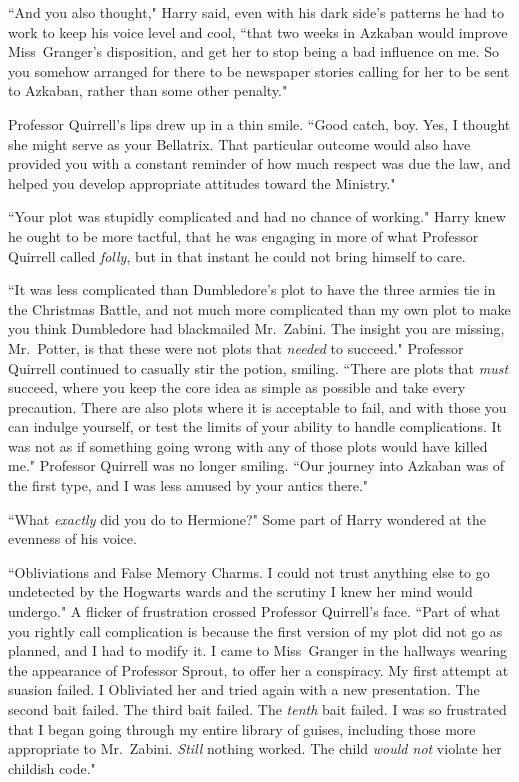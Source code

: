 ``And you also thought," Harry said, even with his dark side's patterns he had to work to keep his voice level and cool, ``that two weeks in Azkaban would improve Miss~Granger's disposition, and get her to stop being a bad influence on me. So you somehow arranged for there to be newspaper stories calling for her to be sent to Azkaban, rather than some other penalty."

Professor Quirrell's lips drew up in a thin smile. ``Good catch, boy. Yes, I thought she might serve as your Bellatrix. That particular outcome would also have provided you with a constant reminder of how much respect was due the law, and helped you develop appropriate attitudes toward the Ministry."

``Your plot was stupidly complicated and had no chance of working." Harry knew he ought to be more tactful, that he was engaging in more of what Professor Quirrell called \emph{folly}, but in that instant he could not bring himself to care.

``It was less complicated than Dumbledore's plot to have the three armies tie in the Christmas Battle, and not much more complicated than my own plot to make you think Dumbledore had blackmailed Mr.~Zabini. The insight you are missing, Mr.~Potter, is that these were not plots that \emph{needed} to succeed." Professor Quirrell continued to casually stir the potion, smiling. ``There are plots that \emph{must} succeed, where you keep the core idea as simple as possible and take every precaution. There are also plots where it is acceptable to fail, and with those you can indulge yourself, or test the limits of your ability to handle complications. It was not as if something going wrong with any of those plots would have killed me." Professor Quirrell was no longer smiling. ``Our journey into Azkaban was of the first type, and I was less amused by your antics there."

``What \emph{exactly} did you do to Hermione?" Some part of Harry wondered at the evenness of his voice.

``Obliviations and False Memory Charms. I could not trust anything else to go undetected by the Hogwarts wards and the scrutiny I knew her mind would undergo." A flicker of frustration crossed Professor Quirrell's face. ``Part of what you rightly call complication is because the first version of my plot did not go as planned, and I had to modify it. I came to Miss~Granger in the hallways wearing the appearance of Professor Sprout, to offer her a conspiracy. My first attempt at suasion failed. I Obliviated her and tried again with a new presentation. The second bait failed. The third bait failed. The \emph{tenth} bait failed. I was so frustrated that I began going through my entire library of guises, including those more appropriate to Mr.~Zabini. \emph{Still} nothing worked. The child \emph{would not} violate her childish code."

